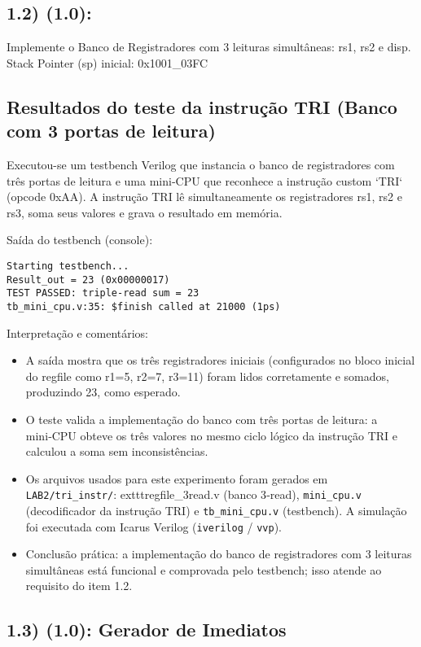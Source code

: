 \documentclass[12pt,a4paper]{article}
\begin{document}
\subsection*{1.2) (1.0): } Implemente o Banco de Registradores com 3 leituras simultâneas: rs1, rs2 e disp.
Stack Pointer (sp) inicial: 0x1001_03FC


\subsection{Resultados do teste da instrução TRI (Banco com 3 portas de leitura)}

Executou-se um testbench Verilog que instancia o banco de registradores com três portas de leitura e uma mini‑CPU que reconhece a instrução custom `TRI` (opcode 0xAA). A instrução TRI lê simultaneamente os registradores rs1, rs2 e rs3, soma seus valores e grava o resultado em memória.

Saída do testbench (console):
\begin{verbatim}
Starting testbench...
Result_out = 23 (0x00000017)
TEST PASSED: triple-read sum = 23
tb_mini_cpu.v:35: $finish called at 21000 (1ps)
\end{verbatim}

Interpretação e comentários:
\begin{itemize}
    \item A saída mostra que os três registradores iniciais (configurados no bloco inicial do regfile como r1=5, r2=7, r3=11) foram lidos corretamente e somados, produzindo 23, como esperado.
    \item O teste valida a implementação do banco com três portas de leitura: a mini‑CPU obteve os três valores no mesmo ciclo lógico da instrução TRI e calculou a soma sem inconsistências.
    \item Os arquivos usados para este experimento foram gerados em \texttt{LAB2/tri\_instr/}: 
    	exttt{regfile\_3read.v} (banco 3‑read), \texttt{mini\_cpu.v} (decodificador da instrução TRI) e \texttt{tb\_mini\_cpu.v} (testbench). A simulação foi executada com Icarus Verilog (\texttt{iverilog} / \texttt{vvp}).
    \item Conclusão prática: a implementação do banco de registradores com 3 leituras simultâneas está funcional e comprovada pelo testbench; isso atende ao requisito do item 1.2.
\end{itemize}

\subsection{1.3) (1.0): Gerador de Imediatos}
\end{document}
